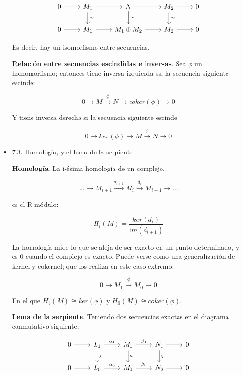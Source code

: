 \documentclass[11pt]{article}
\begin{document}
\begin{itemize}
\begin{definition}
\[ \begin{tikzcd}
 0   \arrow{r}{} & 
 M_1 \arrow{d}{\sim}\arrow{r}{} & 
 N   \arrow{d}{\sim}\arrow{r}{} & 
 M_2 \arrow{d}{\sim}\arrow{r}{} & 
 0 \\
 0   \arrow{r}{} & 
 M_1 \arrow{r}{} & 
 M_1 \oplus M_2   \arrow{r}{} & 
 M_2 \arrow{r}{} & 
 0
 \end{tikzcd} \]

Es decir, hay un isomorfismo entre secuencias.
\end{definition}

\begin{theorem}
\textbf{Relación entre secuencias escindidas e inversas}. Sea $\phi$ un homomorfismo;
entonces tiene inversa izquierda ssi la secuencia siguiente escinde:

\[ 0 \longrightarrow M \overset{\phi}\longrightarrow N \longrightarrow coker(\phi) \longrightarrow 0 \]

Y tiene inversa derecha si la secuencia siguiente escinde:

\[ 0 \longrightarrow ker(\phi) \longrightarrow M \overset{\phi}\longrightarrow N \longrightarrow 0 \]
\end{theorem}

\item 7.3. Homología, y el lema de la serpiente
\label{sec-4-1-1-3}
\begin{definition}
\textbf{Homología}. La i-ésima homología de un complejo,

\[ \dots \longrightarrow M_{i+1} \overset{d_{i+1}}\longrightarrow M_i \overset{d_i}\longrightarrow M_{i-1} \longrightarrow \dots \]

es el R-módulo:

\[H_i(M) = \frac{ker(d_i)}{im(d_{i+1})}\]
\end{definition}

La homología mide lo que se aleja de ser exacto en un punto determinado, y
es $0$ cuando el complejo es exacto. Puede verse como una generalización de
kernel y cokernel; que los realiza en este caso extremo:

\[ 0 \longrightarrow M_1 \overset{\phi}\longrightarrow M_0 \longrightarrow 0 \]

En el que $H_1(M) \cong ker(\phi)$ y $H_0(M) \cong coker(\phi)$.

\begin{theorem}
\textbf{Lema de la serpiente}. Teniendo dos secuencias exactas en el diagrama 
conmutativo siguiente:

\[ \begin{tikzcd}
 0 \rar & L_1 \rar{\alpha_1}\arrow{d}{\lambda} & M_1 \rar{\beta_1}\arrow{d}{\mu} & N_1 \rar\arrow{d}{\eta} & 0 \\
 0 \rar & L_0 \rar{\alpha_0}                   & M_0 \rar{\beta_0}               & N_0 \rar                & 0
 \end{tikzcd} \]


\end{theorem}
\end{itemize}
\end{document}
